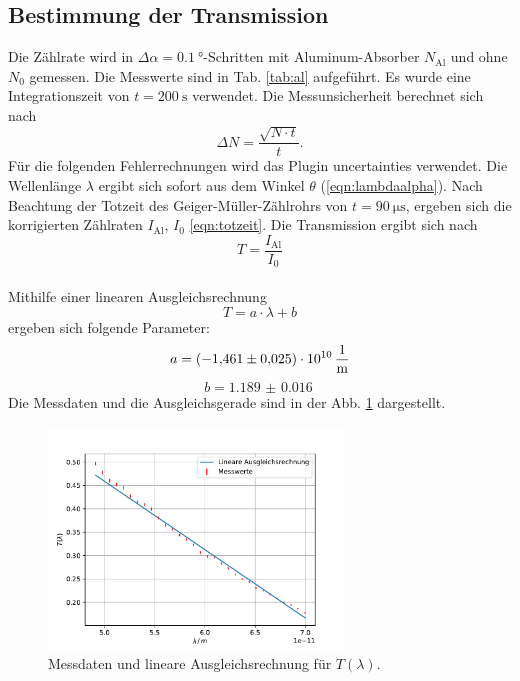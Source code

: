 \subsection{Bestimmung der Transmission}
Die Zählrate wird in $\Delta\alpha=\SI{0.1}{\degree}$-Schritten mit Aluminum-Absorber $N_\text{Al}$ und ohne $N_0$ gemessen.
Die Messwerte sind in Tab. \ref{tab:al} aufgeführt.
Es wurde eine Integrationszeit von $t=\SI{200}{\second}$ verwendet.
Die Messunsicherheit berechnet sich nach
\begin{equation}
    \Delta N=\frac{\sqrt{N \cdot t}}{t} .
\end{equation}
Für die folgenden Fehlerrechnungen wird das Plugin uncertainties \cite{uncertainties} verwendet.
Die Wellenlänge $\lambda$ ergibt sich sofort aus dem Winkel $\theta$ (\autoref{eqn:lambdaalpha}).
Nach Beachtung der Totzeit des Geiger-Müller-Zählrohrs von $t=\SI{90}{\micro\second}$, ergeben sich die korrigierten Zählraten $I_\text{Al}$, $I_0$ \ref{eqn:totzeit}.
Die Transmission ergibt sich nach
\begin{equation*}
    T = \frac{I_\text{Al}}{I_0}
\end{equation*}
\\
Mithilfe einer linearen Ausgleichsrechnung
\begin{equation}
    T = a \cdot \lambda + b
    \label{eqn:gerade}
\end{equation}
ergeben sich folgende Parameter:
\begin{equation*}
    a = \SI{-1.461(25)e10}{\frac{1}{\metre}}
\end{equation*}
\begin{equation*}
    b = \SI{1.189(16)}{}
\end{equation*}
Die Messdaten und die Ausgleichsgerade sind in der Abb. \ref{fig:trans} dargestellt.
\begin{figure}
    \centering
    \includegraphics[width=0.7\textwidth]{content/data/linear.pdf}
    \caption{Messdaten und lineare Ausgleichsrechnung für $T(\lambda)$. \cite{matplotlib} \cite{scipy}}
    \label{fig:trans}
\end{figure}

